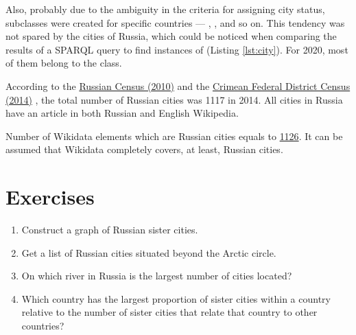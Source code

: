 Also, probably due to the ambiguity in the criteria for assigning city status, subclasses were created for specific countries — , ,  and so on. This tendency was not spared by the cities of Russia, which could be noticed when comparing the results of a SPARQL query to find instances of   (Listing \ref{lst:city}). For 2020, most of them belong to the  class.

According to the \href{http://www.gks.ru/free\_doc/new\_site/perepis2010/croc/Documents/Vol1/pub-01-03.pdf}{Russian Census (2010)}  and the \href{https://rosstat.gov.ru/free\_doc/new\_site/population/demo/perepis\_krim/KRUM\_2015.pdf}{Crimean Federal District Census (2014)} , the total number of Russian cities was \num{1117} in 2014. All cities in Russia have an article in both Russian and English Wikipedia.

Number of Wikidata elements which are Russian cities equals to \href{https://w.wiki/ngM}{\num{1126}}. It can be assumed that Wikidata completely covers, at least, Russian cities.

\section{Exercises}
\begin{enumerate}
\item Construct a graph of Russian sister cities.
\item Get a list of Russian cities situated beyond the Arctic circle.
\item On which river in Russia is the largest number of cities located?
\item Which country has the largest proportion of sister cities within a country relative to the number of sister cities that relate that country to other countries?
\end{enumerate}